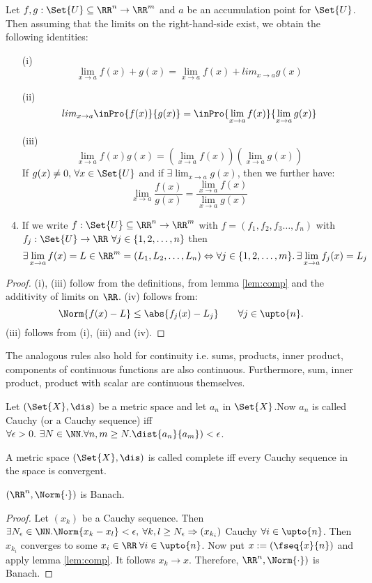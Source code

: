 \begin{thm}
 Let $f,g:\Set{U}\subseteq\RR^n\to\RR^m$ and $a$ be an accumulation point for $\Set{U}$. Then assuming that the limits on the right-hand-side exist, we obtain the following identities:
 \begin{enumerate}
  \item[(i)] $$\lim_{x\to a}f(x)+g(x)=\lim_{x\to a}f(x)+lim_{x\to a}g(x)$$
  \item[(ii)] $$lim_{x\to a}\inPro{f(x)}{g(x)}=\inPro{\lim_{x\to a}f(x)}{\lim_{x\to a}g(x)}$$
  \item[(iii)] $$\lim_{x\to a}f(x)g(x)=\left(\lim_{x\to a}f(x)\right)\left(\lim_{x\to a}g(x)\right)$$
  If $g(x)\neq 0,\,\forall x\in\Set{U}$ and if $\exists \lim_{x\to a}g(x)$, then we further have:
  $$\lim_{x\to a}\frac{f(x)}{g(x)}=\frac{\lim_{x\to a}f(x)}{\lim_{x\to a}g(x)}$$
  \item If we write $f:\Set{U}\subseteq\RR^n\to\RR^m$ with $f=(f_1,f_2,f_3\ldots,f_n)$ with $f_j:\Set{U}\to\RR\ \forall j\in\{1,2,\ldots,n\}$ then $$\exists\lim_{x\to a}f(x)=L\in \RR^m=(L_1,L_2,\ldots,L_n)\Leftrightarrow \forall j\in\{1,2,\ldots,m\}.\,\exists\lim_{x\to a}f_j(x)=L_j$$
 \end{enumerate}
\end{thm}
\begin{proof}
 (i), (iii) follow from the definitions, from lemma \ref{lem:comp} and the additivity of limits on $\RR$.
 (iv) follows from: $$\Norm{f(x)-L}\leq \abs{f_j(x)-L_j}\qquad\forall j\in\upto{n}.$$
 (iii) follows from (i), (iii) and (iv).
\end{proof}
\begin{rem}
 The analogous rules also hold for continuity i.e. sums, products, inner product, components of continuous functions are also continuous. Furthermore, sum, inner product, product with scalar are continuous themselves.
\end{rem}
\begin{defn}
	Let $(\Set{X},\dis)$ be a metric space and let $a_n$ in $\Set{X}$.Now $a_n$ is called Cauchy (or a Cauchy sequence) iff $\forall \epsilon>0.\ \exists N\in\NN.\forall n,m\geq N.\dist{a_n}{a_m})<\epsilon$.
\end{defn}
\begin{defn}
	A metric space $(\Set{X},\dis)$ is called complete iff every Cauchy sequence in the space is convergent.
\end{defn}
\begin{thm}
 $(\RR^n,\Norm{\cdot})$ is Banach.
\end{thm}
\begin{proof}
 Let $(x_k)$ be a Cauchy sequence. Then $\exists N_\epsilon\in\NN.\Norm{x_k-x_l}<\epsilon, \:\forall k,l \geq N_\epsilon\Rightarrow (x_{k_i})$ Cauchy $\forall i\in\upto{n}$. Then $x_{k_i}$ converges to some $x_i\in\RR\:\forall i\in\upto{n}$. Now put $x:=(\fseq{x}{n})$ and apply lemma \ref{lem:comp}. It follows $x_k\to x$. Therefore, $\RR^n, \Norm{\cdot})$ is Banach.
\end{proof}
